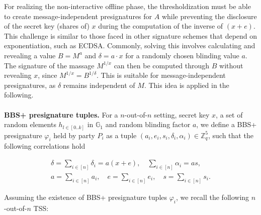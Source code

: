 For realizing the non-interactive offline phase, the thresholdization must be able to create message-independent presignatures for $A$ while preventing the disclosure of the secret key (shares of) $x$ during the computation of the inverse of $(x+e)$. This challenge is similar to those faced in other signature schemes that depend on exponentiation, such as ECDSA. Commonly, solving this involves calculating and revealing a value $B = M^a$ and $\delta = a\cdot x$ for a randomly chosen blinding value $a$. The signature of the massage $M^{1/x}$ can then be computed through $B$ without revealing $x$, since $M^{1/x} = B^{1/\delta}$. This is suitable for message-independent presignatures, as $\delta$ remains independent of $M$. This idea is applied in the following.
\\\\
\textbf{BBS+ presignature tuples.} For a $n$-out-of-$n$ setting, secret key $x$, a set of random elements $h_{l \in [0..k]}$ in $\mathbb{G}_1$ and random blinding factor $a$, we define a BBS+ presignature $\varphi_i$ held by party $P_i$ as a tuple $(a_i,e_i,s_i,\delta_i,\alpha_i) \in \mathbb{Z}^5_q$, such that the following correlations hold

\begin{equation}
\begin{array}{l}
\delta=\sum\limits_{i \in[n]} \delta_i=a(x+e), \quad
\sum\limits_{i \in[n]} \alpha_i=as, \\
a=\sum\limits_{i \in[n]} a_i, \quad e=\sum\limits_{i \in[n]} e_i, \quad s=\sum\limits_{i \in[n]} s_i.
\end{array}
\label{eq:req_correlations}
\end{equation}

Assuming the existence of BBS+ presignature tuples $\varphi_i$, we recall the following $n$-out-of-$n$ TSS:

